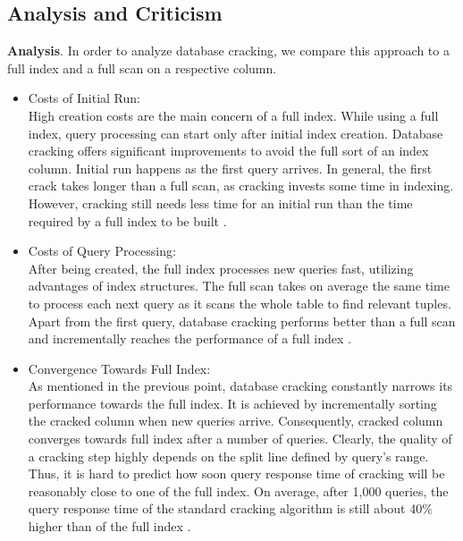 \documentclass[10pt, conference, compsocconf]{IEEEtran}
\begin{document}
\subsection{Analysis and Criticism}
\label{subsec:crack_analysis}
\textbf{Analysis}. In order to analyze database cracking, we compare this approach to a full index and a full scan on a respective column.\\
\begin{itemize}
\item{Costs of Initial Run:} \\High creation costs are the main concern of a full index. While using a full index, query processing can start only after initial index creation. Database cracking offers significant improvements to avoid the full sort of an index column. Initial run happens as the first query arrives. In general, the first crack takes longer than a full scan, as cracking invests some time in indexing. However, cracking still needs less time for an initial run than the time required by a full index to be built \cite{survey_cracking}.\\
\item{Costs of Query Processing:} \\After being created, the full index processes new queries fast, utilizing advantages of index structures. The full scan takes on average the same time to process each next query as it scans the whole table to find relevant tuples. Apart from the first query, database cracking performs better than a full scan and incrementally reaches the performance of a full index \cite{survey_cracking}.\\
\item{Convergence Towards Full Index:} \\As mentioned in the previous point, database cracking constantly narrows its performance towards the full index. It is achieved by incrementally sorting the cracked column when new queries arrive. Consequently, cracked column converges towards full index after a number of queries. Clearly, the quality of a cracking step highly depends on the split line defined by query's range. Thus, it is hard to predict how soon query response time of cracking will be reasonably close to one of the full index. On average, after 1,000 queries, the query response time of the standard cracking algorithm is still about 40\% higher than of the full index \cite{eval2}.\\
\end{itemize}
\end{document}
